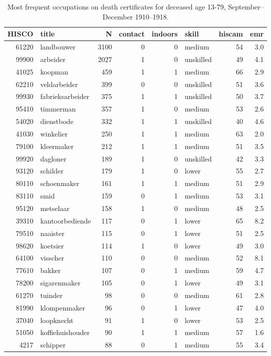 \begin{table}[h!]
\centering
\begin{tabular}{rlrrrlrr}
  \hline
HISCO & title & N & contact & indoors & skill & hiscam & emr \\ 
  \hline
61220 & landbouwer & 3100 &  0 &  0 & medium & 54 & 3.0 \\ 
  99900 & arbeider & 2027 &  1 &  0 & unskilled & 49 & 4.1 \\ 
  41025 & koopman & 459 &  1 &  1 & medium & 66 & 2.9 \\ 
  62210 & veldarbeider & 399 &  0 &  0 & unskilled & 51 & 3.6 \\ 
  99930 & fabrieksarbeider & 375 &  1 &  1 & unskilled & 50 & 3.7 \\ 
  95410 & timmerman & 357 &  1 &  0 & medium & 53 & 2.6 \\ 
  54020 & dienstbode & 332 &  1 &  1 & unskilled & 40 & 4.6 \\ 
  41030 & winkelier & 250 &  1 &  1 & medium & 63 & 2.0 \\ 
  79100 & kleermaker & 212 &  1 &  1 & medium & 51 & 3.5 \\ 
  99920 & dagloner & 189 &  1 &  0 & unskilled & 42 & 3.3 \\ 
  93120 & schilder & 179 &  1 &  0 & lower & 55 & 2.7 \\ 
  80110 & schoenmaker & 161 &  1 &  1 & medium & 51 & 2.9 \\ 
  83110 & smid & 159 &  0 &  1 & medium & 53 & 3.1 \\ 
  95120 & metselaar & 158 &  1 &  0 & medium & 48 & 2.5 \\ 
  39310 & kantoorbediende & 117 &  0 &  1 & lower & 65 & 8.2 \\ 
  79510 & naaister & 115 &  0 &  1 & lower & 51 & 2.5 \\ 
  98620 & koetsier & 114 &  1 &  0 & lower & 49 & 3.0 \\ 
  64100 & visscher & 110 &  0 &  0 & medium & 52 & 8.1 \\ 
  77610 & bakker & 107 &  0 &  1 & medium & 59 & 4.7 \\ 
  78200 & sigarenmaker & 105 &  0 &  1 & lower & 49 & 3.1 \\ 
  61270 & tuinder & 98 &  0 &  0 & medium & 61 & 2.8 \\ 
  81990 & klompenmaker & 96 &  0 &  1 & lower & 47 & 4.0 \\ 
  37040 & loopknecht & 91 &  1 &  0 & lower & 53 & 2.5 \\ 
  51050 & koffiehuishouder & 90 &  1 &  1 & medium & 57 & 1.6 \\ 
  4217 & schipper & 88 &  0 &  1 & medium & 55 & 3.4 \\ 
   \hline
\end{tabular}
\caption{Most frequent occupations on death certificates for deceased age 13-79, September--December 1910--1918.} 
\label{tab:topoccs_selected}
\end{table}

